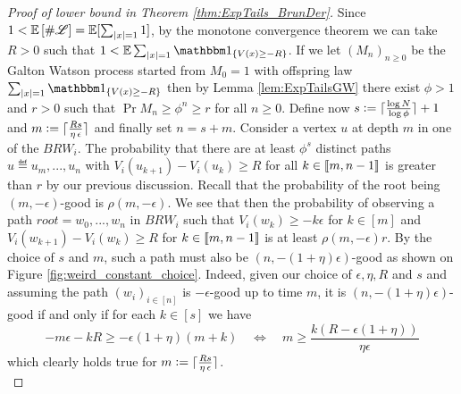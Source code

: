 \begin{proof}[Proof of lower bound in Theorem \ref{thm:ExpTails_BrunDer}]
Since $1 < \mathbb{E}\left[ \#\mathscr{L} \right] = \mathbb{E}[\sum_{|x|=1} 1]$, by the monotone convergence theorem we can take $R > 0$ such that $1 < \E\sum_{|x|=1} \Ind_{\{ V(x) \geq -R\}}$. If we let $(M_n)_{n \geq 0}$ be the Galton Watson process started from $M_0 = 1$ with offspring law $\sum_{|x|=1} \Ind_{\{ V(x) \geq -R\}}$ then by Lemma \ref{lem:ExpTailsGW} there exist $\phi > 1$ and $r > 0$ such that $\Pr{M_n \geq \phi^n} \geq r$ for all $n \geq 0$. Define now $s \vcentcolon= \lceil\frac{\log N}{\log \phi}\rceil + 1$ and $m \vcentcolon= \lceil\frac{Rs}{\eta\, \epsilon}\rceil$ and finally set $n = s + m$. Consider a vertex $u$ at depth $m$ in one of the $BRW_i$. The probability that there are at least $\phi^s$ distinct paths $u \eqdef u_m, ..., u_n$ with $V_i(u_{k+1}) - V_i(u_k) \geq R$ for all $k \in \llbracket m, n - 1\rrbracket$ is greater than $r$ by our previous discussion. Recall that the probability of the root being $(m, - \epsilon)$-good is $\rho(m, - \epsilon)$. We see that then the probability of observing a path $root = w_0, ..., w_n$ in $BRW_i$ such that $V_i(w_k) \geq - k \epsilon$ for $k \in [m]$ and $V_i(w_{k+1}) - V_i(w_k) \geq R$ for $k \in \llbracket m, n-1\rrbracket$ is at least $\rho(m, - \epsilon) r$. By the choice of $s$ and $m$, such a path must also be $(n,  - (1+\eta)\epsilon)$-good as shown on Figure \ref{fig:weird_constant_choice}. Indeed, given our choice of $\epsilon, \eta, R$ and $s$ and assuming the path $(w_i)_{i \in [n]}$ is $-\epsilon$-good up to time $m$, it is $(n, -(1+\eta)\epsilon)$-good if and only if for each $k \in [s]$ we have
\begin{equation}\nonumber
-m\epsilon - kR \geq -\epsilon(1 + \eta)(m + k) \quad\iff\quad m \geq \frac{k(R - \epsilon(1 + \eta))}{\eta \epsilon}
\end{equation}
which clearly holds true for $m \vcentcolon= \lceil\frac{Rs}{\eta\, \epsilon}\rceil$. \\


\end{proof}
